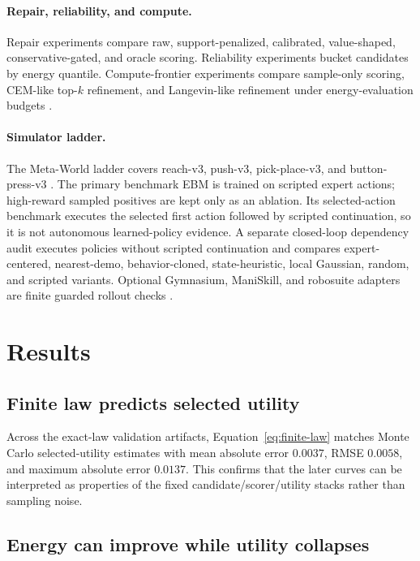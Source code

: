 \documentclass{article}
\begin{document}
\paragraph{Repair, reliability, and compute.}
Repair experiments compare raw, support-penalized, calibrated, value-shaped, conservative-gated, and oracle scoring. Reliability experiments bucket candidates by energy quantile. Compute-frontier experiments compare sample-only scoring, CEM-like top-\(k\) refinement, and Langevin-like refinement under energy-evaluation budgets \citep{rubinstein1999crossentropy,deboer2005tutorial}.

\paragraph{Simulator ladder.}
The Meta-World ladder covers reach-v3, push-v3, pick-place-v3, and button-press-v3 \citep{yu2020metaworld}. The primary benchmark EBM is trained on scripted expert actions; high-reward sampled positives are kept only as an ablation. Its selected-action benchmark executes the selected first action followed by scripted continuation, so it is not autonomous learned-policy evidence. A separate closed-loop dependency audit executes policies without scripted continuation and compares expert-centered, nearest-demo, behavior-cloned, state-heuristic, local Gaussian, random, and scripted variants. Optional Gymnasium, ManiSkill, and robosuite adapters are finite guarded rollout checks \citep{towers2024gymnasium,gu2023maniskill2,zhu2020robosuite}.

\section{Results}

\subsection{Finite law predicts selected utility}

Across the exact-law validation artifacts, Equation~\ref{eq:finite-law} matches Monte Carlo selected-utility estimates with mean absolute error \(0.0037\), RMSE \(0.0058\), and maximum absolute error \(0.0137\). This confirms that the later curves can be interpreted as properties of the fixed candidate/scorer/utility stacks rather than sampling noise.

\subsection{Energy can improve while utility collapses}
\end{document}
